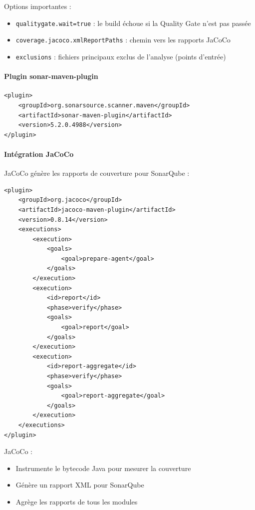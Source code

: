 Options importantes :
\begin{itemize}
    \item \texttt{qualitygate.wait=true} : le build échoue si la Quality Gate n'est pas passée
    \item \texttt{coverage.jacoco.xmlReportPaths} : chemin vers les rapports JaCoCo
    \item \texttt{exclusions} : fichiers principaux exclus de l'analyse (points d'entrée)
\end{itemize}

\paragraph{Plugin sonar-maven-plugin}

\vspace{0.3cm}
\begin{lstlisting}[language=enhancedxml, caption=Plugin SonarQube Maven]
<plugin>
    <groupId>org.sonarsource.scanner.maven</groupId>
    <artifactId>sonar-maven-plugin</artifactId>
    <version>5.2.0.4988</version>
</plugin>
\end{lstlisting}

\paragraph{Intégration JaCoCo}

JaCoCo génère les rapports de couverture pour SonarQube :
\vspace{0.3cm}
\begin{lstlisting}[language=enhancedxml, caption=Configuration JaCoCo]
<plugin>
    <groupId>org.jacoco</groupId>
    <artifactId>jacoco-maven-plugin</artifactId>
    <version>0.8.14</version>
    <executions>
        <execution>
            <goals>
                <goal>prepare-agent</goal>
            </goals>
        </execution>
        <execution>
            <id>report</id>
            <phase>verify</phase>
            <goals>
                <goal>report</goal>
            </goals>
        </execution>
        <execution>
            <id>report-aggregate</id>
            <phase>verify</phase>
            <goals>
                <goal>report-aggregate</goal>
            </goals>
        </execution>
    </executions>
</plugin>
\end{lstlisting}

JaCoCo :
\begin{itemize}
    \item Instrumente le bytecode Java pour mesurer la couverture
    \item Génère un rapport XML pour SonarQube
    \item Agrège les rapports de tous les modules
\end{itemize}

